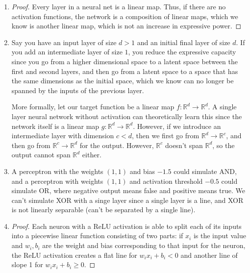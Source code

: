 \begin{solution*}{}{}
\begin{enumerate}
\item \begin{proof}
Every layer in a neural net is a linear map. Thus, if there are no activation
functions, the network is a composition of linear maps, which we know is another
linear map, which is not an increase in expressive power.
\end{proof}

\item Say you have an input layer of size $d > 1$ and an initial final layer of
size $d$. If you add an intermediate layer of size $1$, you reduce the
expressive capacity since you go from a higher dimensional space to a latent
space between the first and second layers, and then go from a latent space to a
space that has the same dimensions as the initial space, which we know can no
longer be spanned by the inputs of the previous layer. 

More formally, let our target function be a linear map $f:\mathbb{R}^{d} \to
\mathbb{R}^{d}$. A single layer neural network without activation can
theoretically learn this since the network itself is a linear map
$g:\mathbb{R}^{d} \to \mathbb{R}^{d}$. However, if we introduce an intermediate
layer with dimension $c < d$, then we first go from $\mathbb{R}^{d}\to
\mathbb{R}^{c}$, and then go from $\mathbb{R}^{c}\to \mathbb{R}^{d}$ for the
output. However, $\mathbb{R}^{c}$ doesn't span $\mathbb{R}^{d}$, so the output
cannot span $\mathbb{R}^{d}$ either.

\item A perceptron with the weights $(1, 1)$ and bias $-1.5$ could simulate AND,
    and a perceptron with weights $(1, 1)$ and activation threshold $-0.5$ could
    simulate OR, where negative output means false and positive means true. We
    can't simulate XOR with a singe layer since a single layer is a line, and
    XOR is not linearly separable (can't be separated by a single line).

\item \begin{proof}
Each neuron with a ReLU activation is able to split each of its inputs into a
piecewise linear function consisting of two parts: if $x_{i}$ is the input value
and $w_{i}, b_{i}$ are the weight and bias corresponding to that input for the
neuron, the ReLU activation creates a flat line for $w_{i}x_{i} + b_{i} < 0$ and 
another line of slope 1 for $w_{i}x_{i}+b_{i} \ge 0$. 


\end{proof}
\end{enumerate}
\end{solution*}
